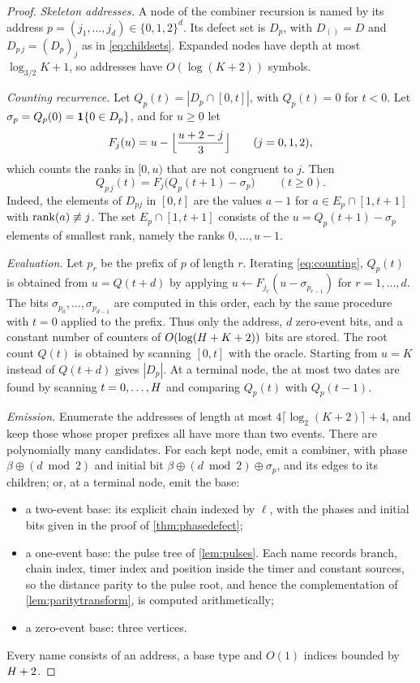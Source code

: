 \begin{proof}
\emph{Skeleton addresses.} A node of the combiner recursion is named by its address
$p=(j_1,\dots,j_d)\in\{0,1,2\}^d$. Its defect set is $D_p$, with $D_{()}=D$ and
$D_{p\,j}=(D_p)_j$ as in \eqref{eq:childsets}. Expanded nodes have depth at most $\log_{3/2}K+1$, so
addresses have $O(\log(K+2))$ symbols.

\emph{Counting recurrence.} Let $Q_p(t)=|D_p\cap[0,t]|$, with $Q_p(t)=0$ for $t<0$. Let
$\sigma_p=Q_p(0)=\mathbf{1}\{0\in D_p\}$, and for $u\ge0$ let
\[
F_j(u)=u-\Bigl\lfloor\frac{u+2-j}{3}\Bigr\rfloor\qquad(j=0,1,2),
\]
which counts the ranks in $[0,u)$ that are not congruent to $j$. Then
\begin{equation}\label{eq:counting}
Q_{p\,j}(t)=F_j\bigl(Q_p(t+1)-\sigma_p\bigr)\qquad(t\ge 0).
\end{equation}
Indeed, the elements of $D_{pj}$ in $[0,t]$ are the values $a-1$ for $a\in E_p\cap[1,t+1]$ with
$\operatorname{rank}(a)\not\equiv j$. The set $E_p\cap[1,t+1]$ consists of the $u=Q_p(t+1)-\sigma_p$ elements of
smallest rank, namely the ranks $0,\dots,u-1$.

\emph{Evaluation.} Let $p_r$ be the prefix of $p$ of length $r$. Iterating \eqref{eq:counting},
$Q_{p}(t)$ is obtained from $u=Q(t+d)$ by applying $u\leftarrow F_{j_r}(u-\sigma_{p_{r-1}})$ for
$r=1,\dots,d$. The bits $\sigma_{p_0},\dots,\sigma_{p_{d-1}}$ are computed in this order, each by
the same procedure with $t=0$ applied to the prefix. Thus only the address, $d$ zero-event bits, and
a constant number of counters of $O(\log(H+K+2))$ bits are stored. The root count $Q(t)$ is
obtained by scanning $[0,t]$ with the oracle. Starting from $u=K$ instead of $Q(t+d)$ gives $|D_p|$.
At a terminal node, the at most two dates are found by scanning $t=0,\dots,H$ and comparing
$Q_p(t)$ with $Q_p(t-1)$.

\emph{Emission.} Enumerate the addresses of length at most $4\lceil\log_2(K+2)\rceil+4$, and keep
those whose proper prefixes all have more than two events. There are polynomially many candidates.
For each kept node, emit a combiner, with phase $\beta\oplus(d\bmod2)$ and initial bit
$\beta\oplus(d\bmod2)\oplus\sigma_p$, and its edges to its children; or, at a terminal node, emit the
base:
\begin{itemize}
\item a two-event base: its explicit chain indexed by $\ell$, with the phases and initial bits given
  in the proof of \cref{thm:phasedefect};
\item a one-event base: the pulse tree of \cref{lem:pulses}. Each name records branch, chain index,
  timer index and position inside the timer and constant sources, so the distance parity to the pulse
  root, and hence the complementation of \cref{lem:paritytransform}, is computed arithmetically;
\item a zero-event base: three vertices.
\end{itemize}
Every name consists of an address, a base type and $O(1)$ indices bounded by $H+2$.
\end{proof}


